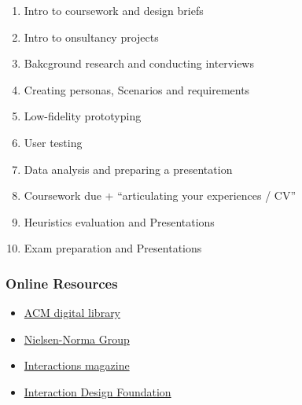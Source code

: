 \documentclass[a4paper]{article}
\begin{document}
\begin{enumerate}
    \item Intro to coursework and design briefs
    \item Intro to onsultancy projects
    \item Bakcground research and conducting interviews
    \item Creating personas, Scenarios and requirements
    \item Low-fidelity prototyping
    \item User testing
    \item Data analysis and preparing a presentation
    \item Coursework due + ``articulating your experiences / CV''
    \item Heuristics evaluation and Presentations
    \item Exam preparation and Presentations
\end{enumerate}

\subsubsection{Online Resources}
\begin{itemize}
    \item \href{https://dl.acm.org}{ACM digital library}
    \item \href{https://www.nngroup.com/articles/}{Nielsen-Norma Group}
    \item \href{https://interactions.acm.org}{Interactions magazine}
    \item \href{https://www.interaction-design.org/}{Interaction Design Foundation}
\end{itemize}



\end{document}
